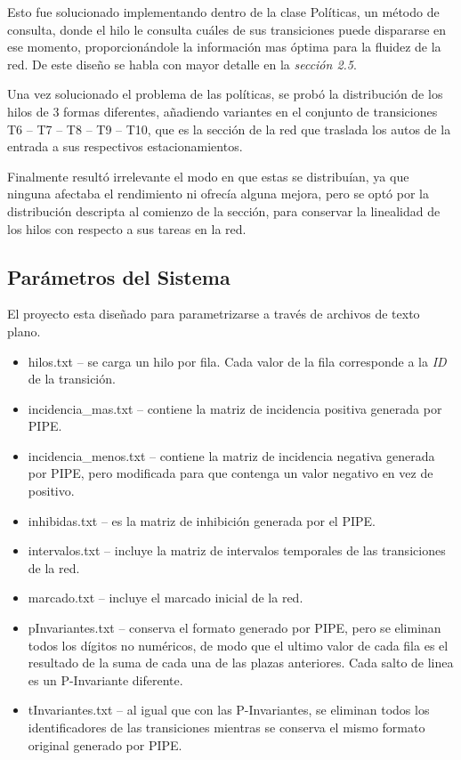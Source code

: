 \documentclass[12pt,a4paper]{article}
\begin{document}
Esto fue solucionado implementando dentro de la clase Políticas, un método de consulta, donde el hilo le consulta cuáles de sus transiciones puede dispararse en ese momento, proporcionándole la información mas óptima para la fluidez de la red. De este diseño se habla con mayor detalle en la \textit{sección 2.5}.  

Una vez solucionado el problema de las políticas, se probó la distribución de los hilos de 3 formas diferentes, añadiendo variantes en el conjunto de transiciones T6 -- T7 -- T8 -- T9 -- T10, que es la sección de la red que traslada los autos de la entrada a sus respectivos estacionamientos.

Finalmente resultó irrelevante el modo en que estas se distribuían, ya que ninguna afectaba el rendimiento ni ofrecía alguna mejora, pero se optó por la distribución descripta al comienzo de la sección, para conservar la linealidad de los hilos con respecto a sus tareas en la red.

\subsection{Parámetros del Sistema}
El proyecto esta diseñado para parametrizarse a través de archivos de texto plano. 

\begin{itemize}[leftmargin=1.5cm]
    \item hilos.txt -- se carga un hilo por fila. Cada valor de la fila corresponde a la \emph{ID} de la transición.
    \item incidencia\_mas.txt -- contiene la matriz de incidencia positiva generada por PIPE.
    \item incidencia\_menos.txt -- contiene la matriz de incidencia negativa generada por PIPE, pero modificada para que contenga un valor negativo en vez de positivo.
    \item inhibidas.txt -- es la matriz de inhibición generada por el PIPE.
    \item intervalos.txt -- incluye la matriz de intervalos temporales de las transiciones de la red.
    \item marcado.txt -- incluye el marcado inicial de la red.
    \item pInvariantes.txt -- conserva el formato generado por PIPE, pero se eliminan todos los dígitos no numéricos, de modo que el ultimo valor de cada fila es el resultado de la suma de cada una de las plazas anteriores. Cada salto de linea es un P-Invariante diferente.
    \item tInvariantes.txt -- al igual que con las P-Invariantes, se eliminan todos los identificadores de las transiciones mientras se conserva el mismo formato original generado por PIPE.
\end{itemize}
\end{document}
